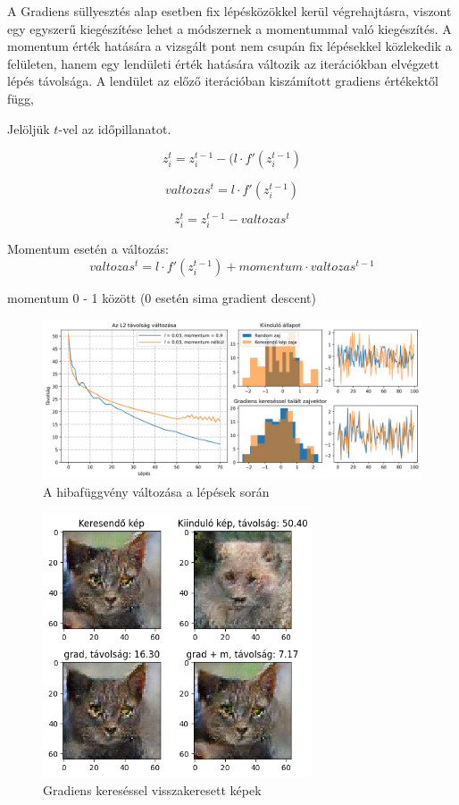 A Gradiens süllyesztés alap esetben fix lépésközökkel kerül végrehajtásra, viszont egy egyszerű kiegészítése lehet a módszernek a momentummal való kiegészítés. A momentum érték hatására a vizsgált pont nem csupán fix lépésekkel közlekedik a felületen, hanem egy lendületi érték hatására változik az iterációkban elvégzett lépés távolsága. A lendület az előző iterációban kiszámított gradiens értékektől függ,

Jelöljük $t$-vel az időpillanatot.

$$ z_i^t = z_i^{t-1} - (l \cdot f'(z_i^{t-1})$$

$$ valtozas^t = l \cdot f'(z_i^{t-1}) $$

$$ z_i^t = z_i^{t-1} - valtozas^t $$


Momentum esetén a változás:
$$ valtozas^t = l \cdot f'(z_i^{t-1}) + momentum \cdot valtozas^{t-1}$$


momentum 0 - 1 között (0 esetén sima gradient descent)


\begin{figure}[h]
\centering
\includegraphics[width=15cm]{images/grad_losses.png}
\caption{A hibafüggvény változása a lépések során}
\label{fig:gradlosses}
\end{figure}


\begin{figure}[h]
\centering
\includegraphics[width=8cm]{images/grad_found.png}
\caption{Gradiens kereséssel visszakeresett képek}
\label{fig:gradfound}
\end{figure}

